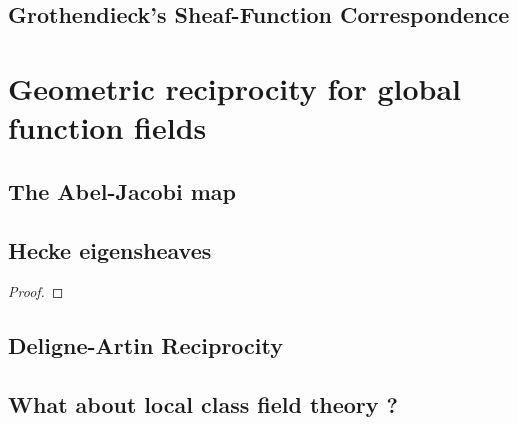         \subsection{Grothendieck's Sheaf-Function Correspondence}
    
    \section{Geometric reciprocity for global function fields}
        \subsection{The Abel-Jacobi map}
    
        \subsection{Hecke eigensheaves}
            \begin{theorem}
                
            \end{theorem}
                \begin{proof}
                        
                \end{proof}
        
        \subsection{Deligne-Artin Reciprocity}
        
        \subsection{What about local class field theory ?}
	
	\printbibliography

